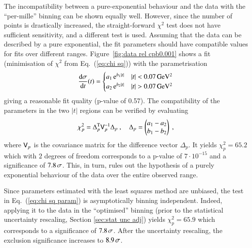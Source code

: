 The incompatibility between a pure-exponential behaviour and the data with the ``per-mille'' binning can be shown equally well. However, since the number of points is drastically increased, the straight-forward $\chi^2$ test does not have sufficient sensitivity, and a different test is used. Assuming that the data can be described by a pure exponential, the fit parameters should have compatible values for fits over different ranges. Figure~\ref{fig:data rel cpb0.001} shows a fit (minimisation of $\chi^2$ from Eq.~(\ref{eq:chi sq})) with the parametrisation
\begin{equation}
\label{eq:split fit param}
{{\rm d}\sigma\over{\rm d}t}(t) =
\begin{cases}
a_1\, {\rm e}^{b_1 |t|} & |t| < 0.07\,{\rm GeV^2}\\
a_2\, {\rm e}^{b_2 |t|} & |t| > 0.07\,{\rm GeV^2}\\
\end{cases}
\end{equation}
giving a reasonable fit quality (p-value of 0.57). The compatibility of the parameters in the two $|t|$ regions can be verified by evaluating
\begin{equation}
\label{eq:chi sq param}
\chi_p^2 = \Delta_p^{\rm T} \mathsf{V}_p^{-1} \Delta_p\ ,\quad \Delta_p =
\begin{pmatrix}
a_1 - a_2\\
b_1 - b_2\\
\end{pmatrix}\ ,
\end{equation}
where $\mathsf{V}_p$ is the covariance matrix for the difference vector $\Delta_p$. It yields $\chi_p^2 = 65.2$ which with $2$ degrees of freedom corresponds to a p-value of $7\cdot10^{-15}$ and a significance of $7.8\,{\rm \sigma}$. This, in turn, rules out the hypothesis of a purely exponential behaviour of the data over the entire observed range.

Since parameters estimated with the least squares method are unbiased, the test in Eq.~(\ref{eq:chi sq param}) is asymptotically binning independent. Indeed, applying it to the data in the ``optimised'' binning (prior to the statistical uncertainty rescaling, Section \ref{sec:stat unc adj}) yields $\chi^2_p = 65.9$ which corresponds to a significance of $7.8\,{\rm \sigma}$. After the uncertainty rescaling, the exclusion significance increases to $8.9\,{\rm \sigma}$.

